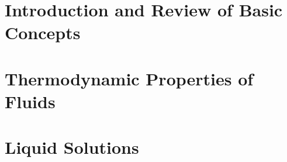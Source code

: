 \documentclass[11pts,a4paper,amsmath,amssymb,floatfix]{book}
\makeatletter
\theoremstyle{definition}
\newcommand{\blue}{\textcolor{blue}}
\newcounter{examplecounter}
\def\etocarticlestyle{%
    \etocsettocstyle
    {\section *{\contentsname
         }
         }
    {}}
\newcommand{\extraPartText}[1]{\def\@extraPartText{#1}}
\makeatother
\begin{document}
\setcounter{page}{1}

\tableofcontents
\vfill
\etocarticlestyle

\pagebreak
\listoftables
\vfill
\pagebreak
\listoffigures
\vfill
\pagebreak

\makeatletter\@openrightfalse
\extraPartText{\blue{(Contents of this Part are not examinable. They were designed to help with some of the notations and definitions used in the remaining of this Notes.)}}
\part{Introduction and Review of Basic Concepts}
   
     \setcounter{examplecounter}{0}

     \setcounter{examplecounter}{0}
     \setcounter{examplecounter}{0}

\part{Thermodynamic Properties of Fluids}  
     \setcounter{examplecounter}{0}
     \setcounter{examplecounter}{0}
     \setcounter{examplecounter}{0}
  

\part{Liquid Solutions}
  

%  
\end{document}
